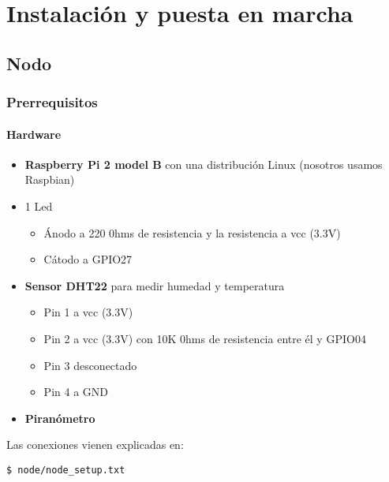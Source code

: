 \cleardoublepage

\chapter{Instalación y puesta en marcha}
\label{makereference6}

\section{Nodo}
\subsection{Prerrequisitos}
\subsubsection{Hardware}
	\begin{itemize}
		\item \textbf{Raspberry Pi 2 model B} con una distribución Linux (nosotros usamos Raspbian)
		\item 1 Led
			\begin{itemize}
				\item Ánodo a 220 0hms de resistencia y la resistencia a vcc (3.3V)
				\item Cátodo a GPIO27
			\end{itemize}
		\item \textbf{Sensor DHT22} para medir humedad y temperatura
			\begin{itemize}
				\item Pin 1 a vcc (3.3V)
				\item Pin 2 a vcc (3.3V) con 10K 0hms de resistencia entre él y GPIO04
				\item Pin 3 desconectado
				\item Pin 4 a GND
			\end{itemize}
		\item \textbf{Piranómetro}
	\end{itemize}

	Las conexiones vienen explicadas en:
\lstset{language=bash}
\begin{lstlisting}[frame=single]
$ node/node_setup.txt
\end{lstlisting}

